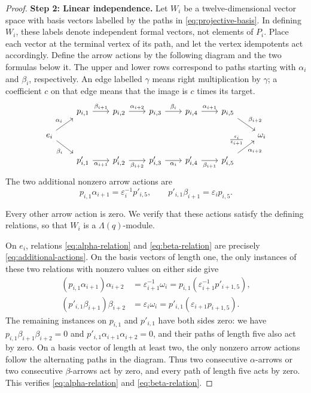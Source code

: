 \documentclass[a4paper,reqno,10pt]{amsart}
\theoremstyle{definition}
\numberwithin{equation}{section}
\begin{document}
\begin{proof}
\medskip
\noindent\textbf{Step 2: Linear independence.}
Let $W_i$ be a twelve-dimensional vector space with basis vectors labelled
by the paths in \eqref{eq:projective-basis}. In defining $W_i$, these labels
denote independent formal vectors, not elements of $P_i$. Place each vector
at the terminal vertex of its path, and let the vertex idempotents act
accordingly. Define the arrow actions by the following diagram and the two
formulas below it. The upper and lower rows correspond to paths starting
with $\alpha_i$ and $\beta_i$, respectively. An edge labelled $\gamma$
means right multiplication by $\gamma$; a coefficient $c$ on that edge
means that the image is $c$ times its target.
\[
\begin{tikzcd}[column sep=2em,row sep=1.4em]
 & p_{i,1} \arrow[r,"\beta_{i+1}"]
 & p_{i,2} \arrow[r,"\alpha_{i+2}"]
 & p_{i,3} \arrow[r,"\beta_i"]
 & p_{i,4} \arrow[r,"\alpha_{i+1}"]
 & p_{i,5} \arrow[dr,"\beta_{i+2}"] & \\
 e_i \arrow[ur,"\alpha_i"] \arrow[dr,"\beta_i"']
 & & & & & & \omega_i \\
 & p'_{i,1} \arrow[r,"\alpha_{i+1}"']
 & p'_{i,2} \arrow[r,"\beta_{i+2}"']
 & p'_{i,3} \arrow[r,"\alpha_i"']
 & p'_{i,4} \arrow[r,"\beta_{i+1}"']
 & p'_{i,5} \arrow[ur,"\alpha_{i+2}"',
   "\frac{\varepsilon_i}{\varepsilon_{i+1}}"] &
\end{tikzcd}
\]
The two additional nonzero arrow actions are
\begin{equation}
 p_{i,1}\alpha_{i+1}=\varepsilon_i^{-1}p'_{i,5},
 \qquad p'_{i,1}\beta_{i+1}=\varepsilon_i p_{i,5}.
 \label{eq:additional-actions}
\end{equation}

Every other arrow action is zero. We verify that these actions satisfy
the defining relations, so that $W_i$ is a $\Lambda(q)$-module.

On $e_i$, relations
\eqref{eq:alpha-relation} and \eqref{eq:beta-relation} are precisely
\eqref{eq:additional-actions}. On the basis vectors of length one, the
only instances of these two relations with nonzero values on either side give
\begin{align*}
 (p_{i,1}\alpha_{i+1})\alpha_{i+2}
 &=\varepsilon_{i+1}^{-1}\omega_i
 =p_{i,1}(\varepsilon_{i+1}^{-1}p'_{i+1,5}),\\
 (p'_{i,1}\beta_{i+1})\beta_{i+2}
 &=\varepsilon_i\omega_i
 =p'_{i,1}(\varepsilon_{i+1}p_{i+1,5}).
\end{align*}
The remaining instances on $p_{i,1}$ and $p'_{i,1}$ have both sides
zero: we have
$p_{i,1}\beta_{i+1}\beta_{i+2}=0$ and
$p'_{i,1}\alpha_{i+1}\alpha_{i+2}=0$, and their paths of length five
also act by zero. On a basis vector of length at least two, the only
nonzero arrow actions follow the alternating paths in the diagram.
Thus two consecutive $\alpha$-arrows or two consecutive $\beta$-arrows
act by zero, and every path of length five acts by zero. This verifies
\eqref{eq:alpha-relation} and \eqref{eq:beta-relation}.


\end{proof}
\end{document}
